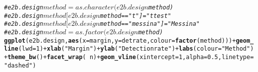 \documentclass{article}\usepackage[]{graphicx}\usepackage[]{color}
\makeatletter
\newcommand{\hlnum}[1]{\textcolor[rgb]{0.686,0.059,0.569}{#1}}%
\newcommand{\hlstr}[1]{\textcolor[rgb]{0.192,0.494,0.8}{#1}}%
\newcommand{\hlcom}[1]{\textcolor[rgb]{0.678,0.584,0.686}{\textit{#1}}}%
\newcommand{\hlopt}[1]{\textcolor[rgb]{0,0,0}{#1}}%
\newcommand{\hlstd}[1]{\textcolor[rgb]{0.345,0.345,0.345}{#1}}%
\newcommand{\hlkwc}[1]{\textcolor[rgb]{0.333,0.667,0.333}{#1}}%
\newcommand{\hlkwd}[1]{\textcolor[rgb]{0.737,0.353,0.396}{\textbf{#1}}}%
\newenvironment{kframe}{%
 \def\at@end@of@kframe{}%
 \ifinner\ifhmode%
  \def\at@end@of@kframe{\end{minipage}}%
  \begin{minipage}{\columnwidth}%
 \fi\fi%
 \def\FrameCommand##1{\hskip\@totalleftmargin \hskip-\fboxsep
 \colorbox{shadecolor}{##1}\hskip-\fboxsep
     \hskip-\linewidth \hskip-\@totalleftmargin \hskip\columnwidth}%
 \MakeFramed {\advance\hsize-\width
   \@totalleftmargin\z@ \linewidth\hsize
   \@setminipage}}%
 {\par\unskip\endMakeFramed%
 \at@end@of@kframe}
\newenvironment{knitrout}{}{} %
\makeatother
\begin{document}
\begin{knitrout}
\color{fgcolor}\begin{kframe}
\begin{alltt}
\hlcom{# e2b.design$method = as.character(e2b.design$method)}
\hlcom{# e2b.design$method[e2b.design$method == "t"] = "t test"}
\hlcom{# e2b.design$method[e2b.design$method == "messina"] = "Messina"}
\hlcom{# e2b.design$method = as.factor(e2b.design$method)}
\hlkwd{ggplot}\hlstd{(e2b.design,} \hlkwd{aes}\hlstd{(}\hlkwc{x} \hlstd{= margin,} \hlkwc{y} \hlstd{= detrate,} \hlkwc{colour} \hlstd{=} \hlkwd{factor}\hlstd{(method)))} \hlopt{+} \hlkwd{geom_line}\hlstd{(}\hlkwc{lwd} \hlstd{=} \hlnum{1}\hlstd{)} \hlopt{+} \hlkwd{xlab}\hlstd{(}\hlstr{"Margin"}\hlstd{)} \hlopt{+} \hlkwd{ylab}\hlstd{(}\hlstr{"Detection rate"}\hlstd{)} \hlopt{+} \hlkwd{labs}\hlstd{(}\hlkwc{colour} \hlstd{=} \hlstr{"Method"}\hlstd{)} \hlopt{+} \hlkwd{theme_bw}\hlstd{()} \hlopt{+} \hlkwd{facet_wrap}\hlstd{(}\hlopt{~} \hlstd{n)} \hlopt{+} \hlkwd{geom_vline}\hlstd{(}\hlkwc{xintercept} \hlstd{=} \hlnum{1}\hlstd{,} \hlkwc{alpha} \hlstd{=} \hlnum{0.5}\hlstd{,} \hlkwc{linetype} \hlstd{=} \hlstr{"dashed"}\hlstd{)}
\end{alltt}


{\ttfamily\noindent\bfseries\color{errorcolor}{\#\# Error in eval(expr, envir, enclos): object 'detrate' not found}}\end{kframe}
\end{knitrout}
\end{document}
